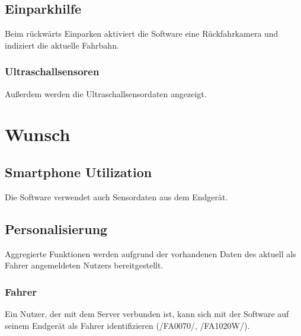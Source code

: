 \documentclass[pflichtenheft.tex]{subfiles}
\begin{document}
\subsection{\mkfa Einparkhilfe}
Beim rückwärts Einparken aktiviert die Software eine Rückfahrkamera und indiziert die aktuelle Fahrbahn.
\subsubsection{\mkfa Ultraschallsensoren}
Außerdem werden die Ultraschallsensordaten angezeigt.

\section{Wunsch}

\subsection{\mkfaw Smartphone Utilization} Die Software verwendet auch Sensordaten aus dem Endgerät.
\subsection{\mkfaw Personalisierung} Aggregierte Funktionen werden aufgrund der vorhandenen Daten des aktuell als Fahrer angemeldeten Nutzers bereitgestellt.

\subsubsection{\mkfaw Fahrer} Ein Nutzer, der mit dem Server verbunden ist, kann sich mit der Software auf seinem Endgerät als Fahrer identifizieren (/FA0070/, /FA1020W/).
\end{document}
